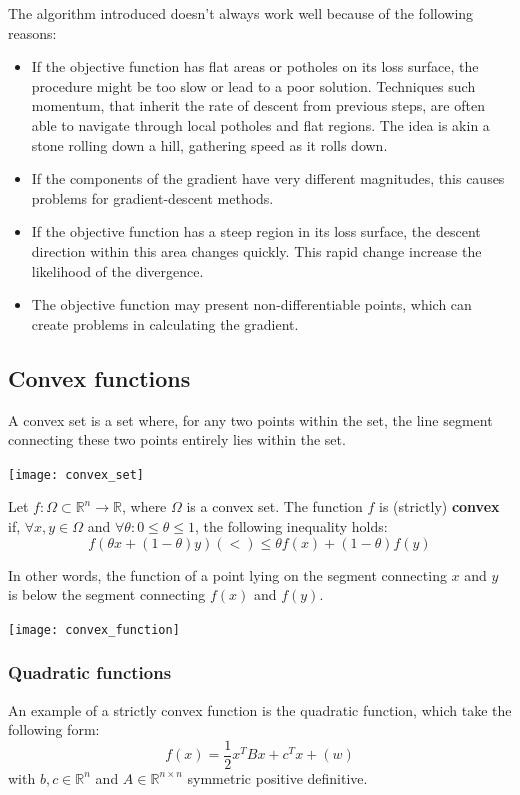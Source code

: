 \documentclass{article}
\begin{document}
The algorithm introduced doesn't always work well because of the following
reasons:
\begin{itemize}
    \item If the objective function has flat areas or potholes on its loss
        surface, the procedure might be too slow or lead to a poor solution.
        Techniques such momentum, that inherit the rate of descent from
        previous steps, are often able to navigate through local potholes and flat
        regions. The idea is akin a stone rolling down a hill, gathering
        speed as it rolls down.
    \item If the components of the gradient have very different magnitudes,
        this causes problems for gradient-descent methods. 
    \item If the objective function has a steep region in its loss surface, the
        descent direction within this area changes quickly. This rapid change
        increase the likelihood of the divergence.
    \item The objective function may present non-differentiable points,
        which can create problems in calculating the gradient.
\end{itemize}

\subsection{Convex functions}

A convex set is a set where, for any two points within the set, the line
segment connecting these two points entirely lies within the set.

\begin{center}
    \texttt{[image: convex\_set]}
\end{center}

\begin{definition}
    Let $f:\Omega\subset \mathbb{R}^n\to \mathbb{R}$, where $\Omega$ is a
    convex set. The function $f$ is (strictly) \textbf{convex} if, $\forall x,y\in\Omega$
    and $\forall\theta:0\leq\theta\leq1$, the following inequality holds:
    $$f(\theta x+(1-\theta)y) (<) \leq\theta f(x)+(1-\theta)f(y)$$
\end{definition}
In other words, the function of a point lying on the segment connecting $x$
and $y$ is below the segment connecting $f(x)$ and $f(y)$.
\begin{center}
    \texttt{[image: convex\_function]}
\end{center}
\subsubsection{Quadratic functions}
An example of a strictly convex function is the quadratic function, which take the
following form:
$$f(x)=\frac{1}{2}x^TBx+c^Tx+(w)$$
with $b,c\in \mathbb{R}^n$ and $A\in \mathbb{R}^{n\times n}$ symmetric
positive definitive.
\end{document}
